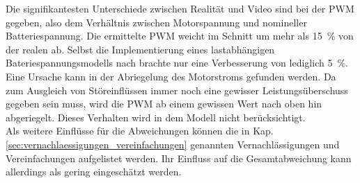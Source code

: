 Die signifikantesten Unterschiede zwischen Realität und Video sind bei der PWM gegeben, also dem Verhältnis zwischen Motorspannung und nomineller Batteriespannung. Die ermittelte PWM weicht im Schnitt um mehr als \SI{15}{\%} von der realen ab. Selbst die Implementierung eines lastabhängigen Bateriespannungsmodells nach \cite{Tremblay.2009} brachte nur eine Verbesserung von lediglich \SI{5}{\%}. Eine Ursache kann in der Abriegelung des Motorstroms gefunden werden. Da zum Ausgleich von Störeinflüssen immer noch eine gewisser Leistungsüberschuss gegeben sein muss, wird die PWM ab einem gewissen Wert nach oben hin abgeriegelt. Dieses Verhalten wird in dem Modell nicht berücksichtigt. \\
Als weitere Einflüsse für die Abweichungen können die in Kap. \ref{sec:vernachlaessigungen_vereinfachungen} genannten Vernachlässigungen und Vereinfachungen aufgelistet werden. Ihr Einfluss auf die Gesamtabweichung kann allerdings als gering eingeschätzt werden.
